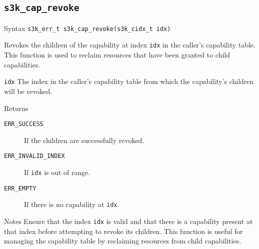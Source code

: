 \documentclass[a4paper,11pt]{article}
\newcommand{\syscall}[1]{\texttt{#1}}
\newenvironment{syscalldoc}[1]{
  \subsection{\syscall{#1}} %
  \begin{tcolorbox}
  \begin{description}[leftmargin=!,style=nextline,noitemsep]
}{
  \end{description}
  \end{tcolorbox}
}
\begin{document}
\begin{syscalldoc}{s3k\_cap\_revoke}
  \item[Syntax] \lstinline{s3k_err_t s3k_cap_revoke(s3k_cidx_t idx)}

  \item[Description] Revokes the children of the capability at index \verb|idx| in the caller's capability table. This function is used to reclaim resources that have been granted to child capabilities.

  \item[Parameters]
    \begin{description}
      \item[]
      \item[\texttt{idx}] The index in the caller's capability table from which the capability's children will be revoked.
    \end{description}

  \item[Returns]
    \begin{description}
      \item[]
      \item[\texttt{ERR\_SUCCESS}] If the children are successfully revoked.
      \item[\texttt{ERR\_INVALID\_INDEX}] If \verb|idx| is out of range.
      \item[\texttt{ERR\_EMPTY}] If there is no capability at \verb|idx|.
    \end{description}

  \item[Notes] Ensure that the index \verb|idx| is valid and that there is a capability present at that index before attempting to revoke its children. This function is useful for managing the capability table by reclaiming resources from child capabilities.
\end{syscalldoc}
\end{document}
